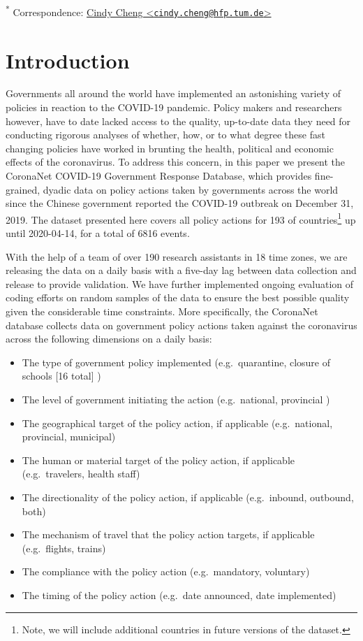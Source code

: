 \documentclass[]{article}
\providecommand{\tightlist}{%
  \setlength{\itemsep}{0pt}\setlength{\parskip}{0pt}}
\let\rmarkdownfootnote\footnote%
\def\footnote{\protect\rmarkdownfootnote}
\begin{document}
\textsuperscript{*} Correspondence: \href{mailto:cindy.cheng@hfp.tum.de}{Cindy Cheng \textless{}\href{mailto:cindy.cheng@hfp.tum.de}{\nolinkurl{cindy.cheng@hfp.tum.de}}\textgreater{}}

\hypertarget{introduction}{%
\section{Introduction}\label{introduction}}

Governments all around the world have implemented an astonishing variety of policies in reaction to the COVID-19 pandemic. Policy makers and researchers however, have to date lacked access to the quality, up-to-date data they need for conducting rigorous analyses of whether, how, or to what degree these fast changing policies have worked in brunting the health, political and economic effects of the coronavirus. To address this concern, in this paper we present the CoronaNet COVID-19 Government Response Database, which provides fine-grained, dyadic data on policy actions taken by governments across the world since the Chinese government reported the COVID-19 outbreak on December 31, 2019. The dataset presented here covers all policy actions for 193 of countries\footnote{Note, we will include additional countries in future versions of the dataset.} up until 2020-04-14, for a total of 6816 events.

With the help of a team of over 190 research assistants in 18 time zones, we are releasing the data on a daily basis with a five-day lag between data collection and release to provide validation. We have further implemented ongoing evaluation of coding efforts on random samples of the data to ensure the best possible quality given the considerable time constraints. More specifically, the CoronaNet database collects data on government policy actions taken against the coronavirus across the following dimensions on a daily basis:

\begin{itemize}
\tightlist
\item
  The type of government policy implemented (e.g.~quarantine, closure of schools {[}16 total{]} )
\item
  The level of government initiating the action (e.g.~national, provincial )
\item
  The geographical target of the policy action, if applicable (e.g.~national, provincial, municipal)
\item
  The human or material target of the policy action, if applicable (e.g.~travelers, health staff)
\item
  The directionality of the policy action, if applicable (e.g.~inbound, outbound, both)
\item
  The mechanism of travel that the policy action targets, if applicable (e.g.~flights, trains)
\item
  The compliance with the policy action (e.g.~mandatory, voluntary)
\item
  The timing of the policy action (e.g.~date announced, date implemented)
\end{itemize}
\end{document}
